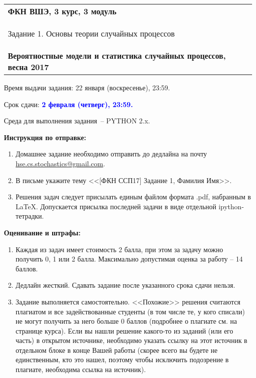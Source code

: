 \documentclass[a4paper,14pt]{extreport}
\renewcommand{\=}[1]{\stackrel{#1}{=}} %
\begin{document}
\begin{center}
    \begin{tabular}{|p{15.5cm}|}
        \hline
        \textbf{ФКН ВШЭ, 3 курс, 3 модуль}\\
        \begin{center} \Large Задание 1. Основы теории случайных процессов
        \end{center}\\
        \textbf{Вероятностные модели и статистика случайных процессов, весна 2017}\\
        \hline
    \end{tabular}
\end{center}

Время выдачи задания: 22 января (воскресенье), 23:59.

Срок сдачи: \textcolor{blue}{\bf 2 февраля (четверг), 23:59.}

Среда для выполнения задания~-- PYTHON 2.x.

\textbf{Инструкция по отправке:} 
\begin{enumerate}
\item Домашнее задание необходимо отправить
до дедлайна на почту \href{mailto:hse.cs.stochastics@gmail.com}
{hse.cs.stochastics@gmail.com}.
\item В письме укажите тему 
<<[ФКН ССП17] Задание 1, Фамилия Имя>>.
\item Решения задач следует присылать единым файлом
формата .pdf, набранным в \LaTeX. Допускается присылка
последней задачи в виде отдельной ipython-тетрадки.
\end{enumerate}

\textbf{Оценивание и штрафы:} 
\begin{enumerate}
\item Каждая из задач имеет стоимость 2 балла, при этом
за задачу можно получить 0, 1 или 2 балла.
Максимально допустимая оценка за работу -- 14 баллов.
\item Дедлайн жесткий. Сдавать задание после указанного
срока сдачи нельзя.
\item Задание выполняется самостоятельно.
<<Похожие>> решения считаются плагиатом и все задействованные студенты (в том числе те, у кого списали) не могут получить за него больше 0 баллов (подробнее о плагиате см. на странице курса). Если вы нашли решение какого-то из заданий (или его часть) в открытом источнике, необходимо указать ссылку на этот источник в отдельном блоке в конце Вашей работы (скорее всего вы будете не единственным, кто это нашел, поэтому чтобы исключить подозрение в плагиате, необходима ссылка на источник).
\end{enumerate}
\end{document}
